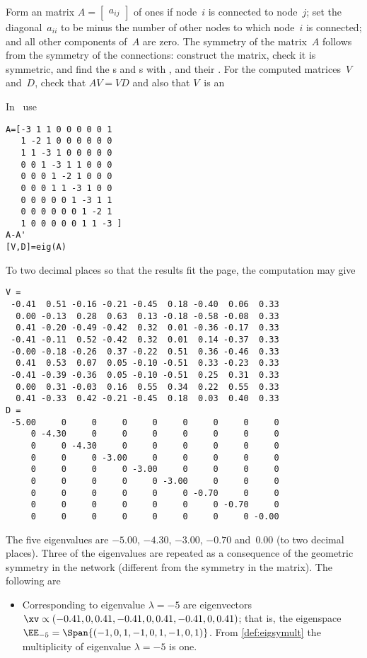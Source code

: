 \begin{example}
Form an matrix \(A=\begin{bmatrix} a_{ij} \end{bmatrix}\) of ones if node~\(i\) is connected to node~\(j\);  set the diagonal~\(a_{ii}\) to be minus the number of other nodes to which node~\(i\) is connected; and all other components of~\(A\) are zero.
The symmetry of the matrix~\(A\) follows from the symmetry of the connections: construct the matrix, check it is symmetric, and find the s and s with \script, and their .
For the computed matrices~\(V\) and~\(D\), check that \(AV=VD\) and also that \(V\)~is an 
\begin{solution} In \script\ use
\setbox\ajrqrbox\hbox{}%
\marginajrbox%
\begin{verbatim}
A=[-3 1 1 0 0 0 0 0 1
   1 -2 1 0 0 0 0 0 0
   1 1 -3 1 0 0 0 0 0
   0 0 1 -3 1 1 0 0 0
   0 0 0 1 -2 1 0 0 0
   0 0 0 1 1 -3 1 0 0
   0 0 0 0 0 1 -3 1 1
   0 0 0 0 0 0 1 -2 1
   1 0 0 0 0 0 1 1 -3 ]
A-A'
[V,D]=eig(A)
\end{verbatim}
To two decimal places so that the results fit the page, the computation may give
{\small%
\begin{verbatim}
V =
 -0.41  0.51 -0.16 -0.21 -0.45  0.18 -0.40  0.06  0.33
  0.00 -0.13  0.28  0.63  0.13 -0.18 -0.58 -0.08  0.33
  0.41 -0.20 -0.49 -0.42  0.32  0.01 -0.36 -0.17  0.33
 -0.41 -0.11  0.52 -0.42  0.32  0.01  0.14 -0.37  0.33
 -0.00 -0.18 -0.26  0.37 -0.22  0.51  0.36 -0.46  0.33
  0.41  0.53  0.07  0.05 -0.10 -0.51  0.33 -0.23  0.33
 -0.41 -0.39 -0.36  0.05 -0.10 -0.51  0.25  0.31  0.33
  0.00  0.31 -0.03  0.16  0.55  0.34  0.22  0.55  0.33
  0.41 -0.33  0.42 -0.21 -0.45  0.18  0.03  0.40  0.33
D =
 -5.00     0     0     0     0     0     0     0     0
     0 -4.30     0     0     0     0     0     0     0
     0     0 -4.30     0     0     0     0     0     0
     0     0     0 -3.00     0     0     0     0     0
     0     0     0     0 -3.00     0     0     0     0
     0     0     0     0     0 -3.00     0     0     0
     0     0     0     0     0     0 -0.70     0     0
     0     0     0     0     0     0     0 -0.70     0
     0     0     0     0     0     0     0     0 -0.00
\end{verbatim}
}%
The five eigenvalues are \(-5.00\), \(-4.30\), \(-3.00\), \(-0.70\) and~\(0.00\) (to two decimal places).
Three of the eigenvalues are repeated as a consequence of the geometric symmetry in the network (different from the symmetry in the matrix).
The following are 
\begin{itemize}
\item Corresponding to eigenvalue \(\lambda=-5\) are eigenvectors \(\sloppy\xv\propto(-0.41,0,0.41,-0.41,0,0.41,-0.41,0,0.41)\); that is, the eigenspace \(\EE_{-5}=\Span\{(-1,0,1,-1,0,1,-1,0,1)\}\).
From \cref{def:eigsymult} the multiplicity of eigenvalue \(\lambda=-5\) is one.


\end{itemize}
\end{solution}
\end{example}

